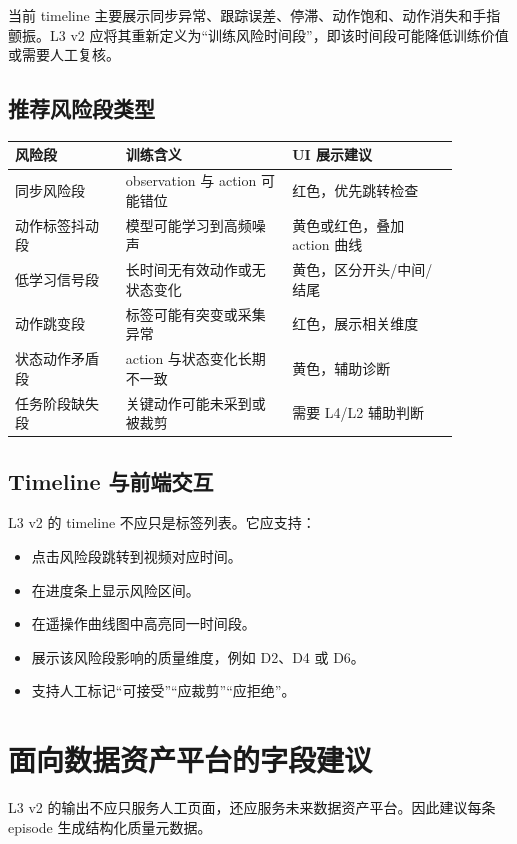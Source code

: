 \documentclass[UTF8,zihao=-4]{ctexart}
\begin{document}
当前 timeline 主要展示同步异常、跟踪误差、停滞、动作饱和、动作消失和手指颤振。L3 v2 应将其重新定义为“训练风险时间段”，即该时间段可能降低训练价值或需要人工复核。

\subsection{推荐风险段类型}

\begin{longtable}{p{0.22\linewidth}p{0.33\linewidth}p{0.33\linewidth}}
\toprule
\textbf{风险段} & \textbf{训练含义} & \textbf{UI 展示建议} \\
\midrule
同步风险段 & observation 与 action 可能错位 & 红色，优先跳转检查 \\
动作标签抖动段 & 模型可能学习到高频噪声 & 黄色或红色，叠加 action 曲线 \\
低学习信号段 & 长时间无有效动作或无状态变化 & 黄色，区分开头/中间/结尾 \\
动作跳变段 & 标签可能有突变或采集异常 & 红色，展示相关维度 \\
状态动作矛盾段 & action 与状态变化长期不一致 & 黄色，辅助诊断 \\
任务阶段缺失段 & 关键动作可能未采到或被裁剪 & 需要 L4/L2 辅助判断 \\
\bottomrule
\end{longtable}

\subsection{Timeline 与前端交互}

L3 v2 的 timeline 不应只是标签列表。它应支持：

\begin{itemize}
  \item 点击风险段跳转到视频对应时间。
  \item 在进度条上显示风险区间。
  \item 在遥操作曲线图中高亮同一时间段。
  \item 展示该风险段影响的质量维度，例如 D2、D4 或 D6。
  \item 支持人工标记“可接受”“应裁剪”“应拒绝”。
\end{itemize}

\section{面向数据资产平台的字段建议}

L3 v2 的输出不应只服务人工页面，还应服务未来数据资产平台。因此建议每条 episode 生成结构化质量元数据。
\end{document}
